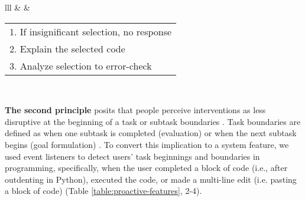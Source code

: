 \begin{table*}[]
\begin{tabular}{lll}
 &
   &
  \begin{tabular}[c]{@{}l@{}}1. If insignificant selection, no response\\ 2. Explain the selected code\\ 3. Analyze selection to error-check\end{tabular}
\\ \hline
\end{tabular}
\caption{\textbf{Proactivity features in \sys{}}. \textnormal{The table details the design rationales derived from interruption management literature \cite{Miyata1986, iqbal2005towards, czerwinski2000instant, bailey2001effects} and prior tools \cite{copilotX, githubcopilot, Nam2023InIDEGI}. We designed six proactivity features triggered by user activities. }
}
\label{table:proactive-features}
\end{table*}


\textbf{The second principle} posits that people perceive interventions as less disruptive at the beginning of a task or subtask boundaries \cite{czerwinski2000instant, iqbal2005towards, Miyata1986}.
Task boundaries are defined as when one subtask is completed (evaluation) or when the next subtask begins (goal formulation) \cite{Miyata1986}.
To convert this implication to a system feature, we used event listeners to detect users' task beginnings and boundaries in programming, specifically, when the user completed a block of code (i.e., after outdenting in Python), executed the code, or made a multi-line edit (i.e. pasting a block of code) (Table \ref{table:proactive-features}, 2-4).



